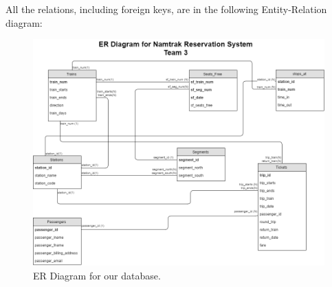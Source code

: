 \documentclass{article}
\begin{document}
All the relations, including foreign keys, are in the following Entity-Relation diagram:

\begin{figure}[H]
  \centering
  \includegraphics[scale=0.5]{erdiagram}
  \caption{ER Diagram for our database.}
\end{figure}
\end{document}
